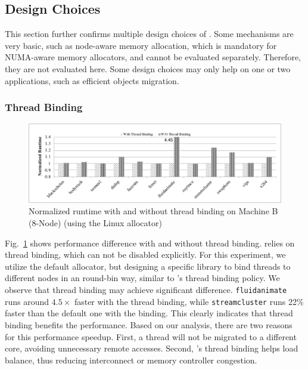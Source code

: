 \subsection{Design Choices}
\label{sec:design}

This section further confirms multiple design choices of \NM{}. Some mechanisms are very basic, such as node-aware memory allocation, which is mandatory for NUMA-aware memory allocators, and cannot be evaluated separately. Therefore, they are not evaluated here. Some design choices may only help on one or two applications, such as efficient objects migration. 
\subsubsection{Thread Binding}
\label{sec: threadbinding}

\begin{figure}[!h]
    \centering
    \includegraphics[width=\textwidth]{figure/WO-pthread-binding.pdf}
    \caption{Normalized runtime with and without thread binding on Machine B (8-Node) (using the Linux allocator)}
    \label{binding-pthread-scalibity}
\end{figure}

Fig.~\ref{binding-pthread-scalibity} shows performance difference with and without thread binding. \NM{} relies on thread binding, which can not be disabled explicitly. For this experiment, we utilize the default allocator, but designing a specific library to bind threads to different nodes in an round-bin way, similar to \NM{}'s thread binding policy. We observe that thread binding may achieve significant difference. \texttt{fluidanimate} runs around $4.5\times$ faster with the thread binding, while  \texttt{streamcluster} runs 22\% faster than the default one with the binding. This clearly indicates that thread binding benefits the performance. Based on our analysis, there are two reasons for this performance speedup. First, a thread will not be migrated to a different core, avoiding unnecessary remote accesses. Second, \NM{}'s thread binding helps load balance, thus reducing interconnect or memory controller congestion.


